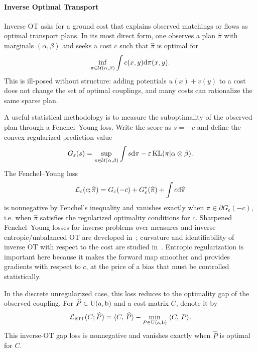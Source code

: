 \paragraph{Inverse Optimal Transport}

Inverse OT asks for a ground cost that explains observed matchings or flows as optimal transport plans. In its most direct form, one observes a plan $\widehat\pi$ with marginals $(\alpha,\beta)$ and seeks a cost $c$ such that $\widehat\pi$ is optimal for
\[
	\inf_{\pi\in\mathcal{U}(\alpha,\beta)}\int c(x,y)\mathrm{d}\pi(x,y).
\]
This is ill-posed without structure: adding potentials $u(x)+v(y)$ to a cost does not change the set of optimal couplings, and many costs can rationalize the same sparse plan.

A useful statistical methodology is to measure the suboptimality of the observed plan through a Fenchel--Young loss. Write the score as $s=-c$ and define the convex regularized prediction value
\[
	G_\varepsilon(s)=
	\sup_{\pi\in\mathcal{U}(\alpha,\beta)}
	\int s\mathrm{d}\pi-\varepsilon\operatorname{KL}(\pi|\alpha\otimes\beta).
\]
The Fenchel--Young loss
\[
	\mathcal L_\varepsilon(c;\widehat\pi)
	=
	G_\varepsilon(-c)+G_\varepsilon^*(\widehat\pi)+\int c\mathrm{d}\widehat\pi
\]
is nonnegative by Fenchel's inequality and vanishes exactly when $\widehat\pi\in\partial G_\epsilon(-c)$, i.e. when $\widehat\pi$ satisfies the regularized optimality conditions for $c$. Sharpened Fenchel--Young losses for inverse problems over measures and inverse entropic/unbalanced OT are developed in~\cite{andrade2025sharpened}; curvature and identifiability of inverse OT with respect to the cost are studied in~\cite{peyre2026curvature}. Entropic regularization is important here because it makes the forward map smoother and provides gradients with respect to $c$, at the price of a bias that must be controlled statistically.

In the discrete unregularized case, this loss reduces to the optimality gap of the observed coupling. For $\widehat P\in\mathrm{U}(\mathrm{a},\mathrm{b})$ and a cost matrix $C$, denote it by
\[
	\mathcal L_{\mathrm{iOT}}(C;\widehat P)
	=
	\langle C,\,\widehat P\rangle
	-
	\underset{P\in\mathrm{U}(\mathrm{a},\mathrm{b})}{\min}\; \langle C,\,P\rangle.
\]
This inverse-OT gap loss is nonnegative and vanishes exactly when $\widehat P$ is optimal for $C$.

